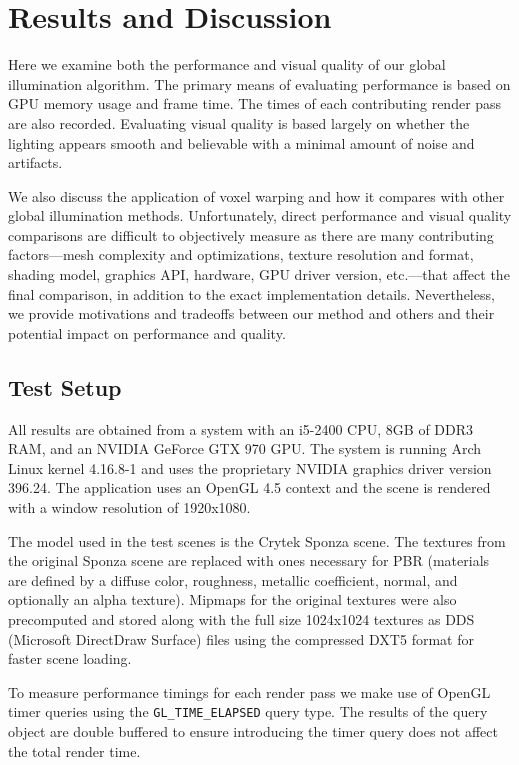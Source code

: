 \chapter{Results and Discussion}

Here we examine both the performance and visual quality of our global illumination algorithm. The primary means of evaluating performance is based on GPU memory usage and frame time. The times of each contributing render pass are also recorded. Evaluating visual quality is based largely on whether the lighting appears smooth and believable with a minimal amount of noise and artifacts.

We also discuss the application of voxel warping and how it compares with other global illumination methods. Unfortunately, direct performance and visual quality comparisons are difficult to objectively measure as there are many contributing factors---mesh complexity and optimizations, texture resolution and format, shading model, graphics API, hardware, GPU driver version, etc.---that affect the final comparison, in addition to the exact implementation details. Nevertheless, we provide motivations and tradeoffs between our method and others and their potential impact on performance and quality.

\section{Test Setup}
All results are obtained from a system with an i5-2400 CPU, 8GB of DDR3 RAM, and an NVIDIA GeForce GTX 970 GPU. The system is running Arch Linux kernel 4.16.8-1 and uses the proprietary NVIDIA graphics driver version 396.24. The application uses an OpenGL 4.5 context and the scene is rendered with a window resolution of 1920x1080.

The model used in the test scenes is the Crytek Sponza scene. The textures from the original Sponza scene are replaced with ones necessary for PBR (materials are defined by a diffuse color, roughness, metallic coefficient, normal, and optionally an alpha texture). Mipmaps for the original textures were also precomputed and stored along with the full size 1024x1024 textures as DDS (Microsoft DirectDraw Surface) files using the compressed DXT5 format for faster scene loading.

To measure performance timings for each render pass we make use of OpenGL timer queries using the \verb#GL_TIME_ELAPSED# query type. The results of the query object are double buffered to ensure introducing the timer query does not affect the total render time.

